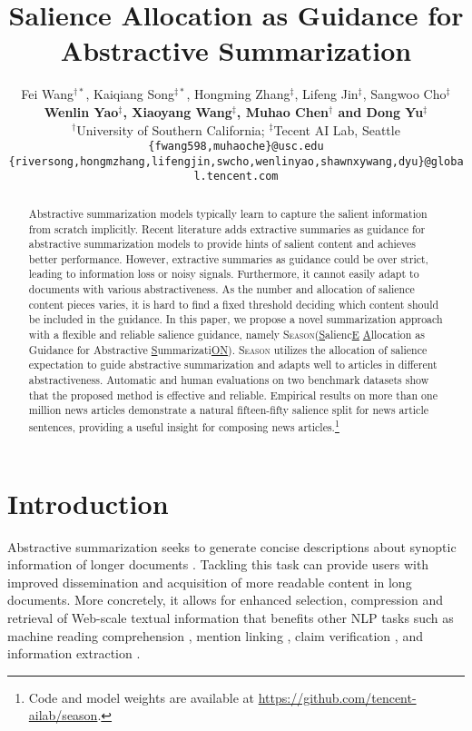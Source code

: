 \documentclass[11pt]{article}
\title{Salience Allocation as Guidance for Abstractive Summarization}
\author{
  Fei Wang$^{\dagger*}$, Kaiqiang Song$^{\ddagger*}$, Hongming Zhang$^{\ddagger}$, Lifeng Jin$^{\ddagger}$, Sangwoo Cho$^{\ddagger}$ \\ 
  \textbf{Wenlin Yao$^{\ddagger}$, Xiaoyang Wang$^{\ddagger}$,  Muhao Chen$^{\dagger}$ and Dong Yu$^{\ddagger}$}
 \\
  $^\dagger$University of Southern California;\; $^\ddagger$Tecent AI Lab, Seattle\\
  \small \texttt{\{fwang598,muhaoche\}@usc.edu} \\ 
  \small \texttt{\{riversong,hongmzhang,lifengjin,swcho,wenlinyao,shawnxywang,dyu\}@global.tencent.com}}
\newcommand{\MODEL}{\mbox{\textsc{Season}}\xspace}
\begin{document}
\maketitle

\renewcommand{\thefootnote}{\fnsymbol{footnote}}
\renewcommand{\thefootnote}{\arabic{footnote}}

\begin{abstract}

Abstractive summarization models typically learn to capture the salient information from scratch implicitly.
Recent literature adds extractive summaries as guidance for abstractive summarization models to provide hints of salient content and achieves better performance.
However, extractive summaries as guidance could be over strict, leading to information loss or noisy signals.
Furthermore, it cannot easily adapt to documents with various abstractiveness.
As the number and allocation of salience content pieces varies, it is hard to find a fixed threshold deciding which content should be included in the guidance.
In this paper, we propose a novel summarization approach with a flexible and reliable salience guidance, namely \MODEL ({\underline{S}}alienc{\underline{E}} {\underline{A}}llocation as Guidance for Abstractive {\underline{S}}ummarizati{\underline{ON}}).
\MODEL utilizes the allocation of salience expectation to guide abstractive summarization and adapts well to articles in different abstractiveness.
Automatic and human evaluations on two benchmark datasets show that the proposed method is effective and reliable.
Empirical results on more than one million news articles demonstrate a natural fifteen-fifty salience split for news article sentences, providing a useful insight for composing news articles.\footnote{Code and model weights are available at \url{https://github.com/tencent-ailab/season}.}

\end{abstract}
 \section{Introduction}




Abstractive summarization seeks to generate concise descriptions about synoptic information of longer documents
\cite{rush2015neural,nallapati2016abstractive,see2017get}. Tackling this task can provide users with improved dissemination and acquisition of more readable content in long documents.
More concretely, it allows for enhanced selection, compression and retrieval of Web-scale textual information that benefits other NLP tasks such as machine reading comprehension \cite{inoue-etal-2021-summarize}, mention linking \cite{cheng2015summarizing}, claim verification \cite{yin-etal-2021-docnli}, and information extraction \cite{lu2022summarization}.
\end{document}
